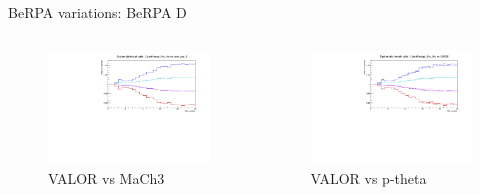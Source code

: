 \documentclass{beamer}
\begin{document}
\begin{frame}{BeRPA variations: BeRPA D}
	\centering
	\begin{columns}
		\begin{column}{0.5\paperwidth}
			\begin{figure}
				\includegraphics[page=9, trim={0cm 0cm 0cm 0cm}, clip, scale=0.35] {images/variations/valor_mach3/variations_prebanff_unosc_1Re}
				\caption*{VALOR vs MaCh3}
			\end{figure}
		\end{column}
		\begin{column}{0.5\paperwidth}
			\begin{figure}
				\includegraphics[page=19, trim={0cm 0cm 0cm 0cm}, clip, scale=0.35] {images/variations/valor_ptheta/variations_prebanff_unosc_1Re}
				\caption*{VALOR vs p-theta}
			\end{figure}
		\end{column}
	\end{columns}
\end{frame}
\end{document}
